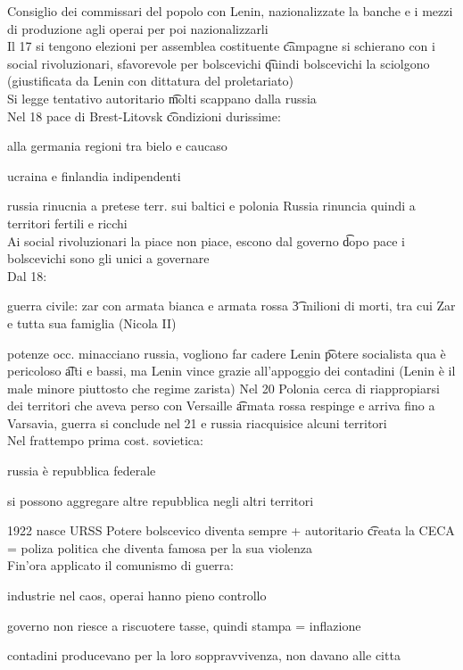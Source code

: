 \documentclass[12pt]{article}
\begin{document}
\ei
Consiglio dei commissari del popolo con Lenin, nazionalizzate la banche e i mezzi di produzione agli operai per poi nazionalizzarli \\
Il 17 si tengono elezioni per assemblea costituente \t campagne si schierano con i social rivoluzionari, sfavorevole per bolscevichi \t quindi bolscevichi la sciolgono (giustificata da Lenin con dittatura del proletariato) \\
Si legge tentativo autoritario \t molti scappano dalla russia \\
Nel 18 pace di Brest-Litovsk \t condizioni durissime:
\bi
\item alla germania regioni tra bielo e caucaso
\item ucraina e finlandia indipendenti
\item russia rinucnia a pretese terr. sui baltici e polonia
\ei
Russia rinuncia quindi a territori fertili e ricchi \\
Ai social rivoluzionari la piace non piace, escono dal governo \t dopo pace i bolscevichi sono gli unici a governare \\
Dal 18:
\bi
  \item guerra civile: zar con armata bianca e armata rossa \t 3 milioni di morti, tra cui Zar e tutta sua famiglia (Nicola II)
  \item potenze occ. minacciano russia, vogliono far cadere Lenin \t potere socialista qua è pericoloso \t alti e bassi, ma Lenin vince grazie all'appoggio dei contadini (Lenin è il male minore piuttosto che regime zarista)
\ei
Nel 20 Polonia cerca di riappropiarsi dei territori che aveva perso con Versaille \t armata rossa respinge e arriva fino a Varsavia, guerra si conclude nel 21 e russia riacquisice alcuni territori \\
Nel frattempo prima cost. sovietica:
\bi
  \item russia è repubblica federale
  \item si possono aggregare altre repubblica negli altri territori
  \item 1922 nasce URSS
\ei
Potere bolscevico diventa sempre + autoritario \t creata la CECA = poliza politica che diventa famosa per la sua violenza \\
Fin'ora applicato il comunismo di guerra: 
\bi
  \item industrie nel caos, operai hanno pieno controllo 
  \item governo non riesce a riscuotere tasse, quindi stampa = inflazione
  \item contadini producevano per la loro soppravvivenza, non davano alle citta
\end{document}
